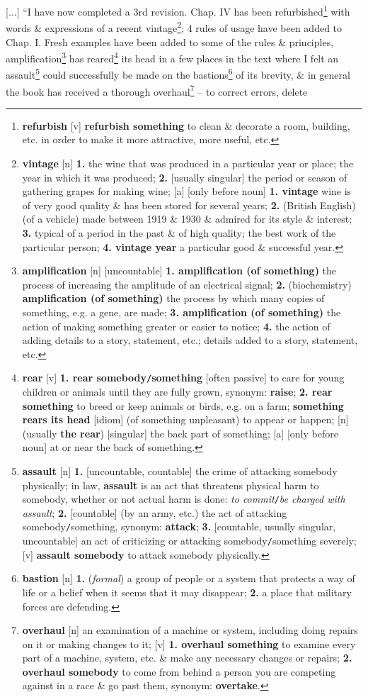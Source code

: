 \documentclass{article}
\begin{document}
[$\ldots$] ``I have now completed a 3rd revision. Chap. IV has been refurbished\footnote{{\bf refurbish} [v] {\bf refurbish something} to clean \& decorate a room, building, etc. in order to make it more attractive, more useful, etc.} with words \& expressions of a recent vintage\footnote{{\bf vintage} [n] {\bf 1.} the wine that was produced in a particular year or place; the year in which it was produced; {\bf 2.} [usually singular] the period or season of gathering grapes for making wine; [a] [only before noun] {\bf 1. vintage} wine is of very good quality \& has been stored for several years; {\bf 2.} (British English) (of a vehicle) made between 1919 \& 1930 \& admired for its style \& interest; {\bf 3.} typical of a period in the past \& of high quality; the best work of the particular person; {\bf 4. vintage year} a particular good \& successful year.}; 4 rules of usage have been added to Chap. I. Fresh examples have been added to some of the rules \& principles, amplification\footnote{{\bf amplification} [n] [uncountable] {\bf 1. amplification (of something)} the process of increasing the amplitude of an electrical signal; {\bf 2.} (biochemistry) {\bf amplification (of something)} the process by which many copies of something, e.g. a gene, are made; {\bf 3. amplification (of something)} the action of making something greater or easier to notice; {\bf 4.} the action of adding details to a story, statement, etc.; details added to a story, statement, etc.} has reared\footnote{{\bf rear} [v] {\bf 1. rear somebody{\tt/}something} [often passive] to care for young children or animals until they are fully grown, {\sc synonym}: {\bf raise}; {\bf 2. rear something} to breed or keep animals or birds, e.g. on a farm; {\bf something rears its head} [idiom] (of something unpleasant) to appear or happen; [n] (usually {\bf the rear}) [singular] the back part of something; [a] [only before noun] at or near the back of something.} its head in a few places in the text where I felt an assault\footnote{{\bf assault} [n] {\bf 1.} [uncountable, countable] the crime of attacking somebody physically; in law, {\bf assault} is an act that threatens physical harm to somebody, whether or not actual harm is done: {\it to commit}{\tt/}{\it be charged with assault}; {\bf 2.} [countable] (by an army, etc.) the act of attacking somebody{\tt/}something, {\sc synonym}: {\bf attack}; {\bf 3.} [countable, usually singular, uncountable] an act of criticizing or attacking somebody{\tt/}something severely; [v] {\bf assault somebody} to attack somebody physically.} could successfully be made on the bastions\footnote{{\bf bastion} [n] {\bf 1.} ({\it formal}) a group of people or a system that protects a way of life or a belief when it seems that it may disappear; {\bf 2.} a place that military forces are defending.} of its brevity, \& in general the book has received a thorough overhaul\footnote{{\bf overhaul} [n] an examination of a machine or system, including doing repairs on it or making changes to it; [v] {\bf 1. overhaul something} to examine every part of a machine, system, etc. \& make any necessary changes or repairs; {\bf 2. overhaul somebody} to come from behind a person you are competing against in a race \& go past them, {\sc synonym}: {\bf overtake}.} -- to correct errors, delete 
\end{document}

